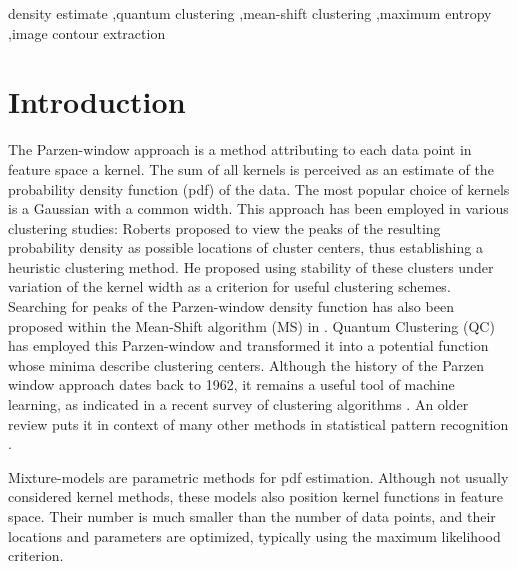 \documentclass[preprint,12pt]{elsarticle}
\begin{document}
\begin{frontmatter}
\begin{abstract}
\end{abstract}

\begin{keyword}
density estimate \sep quantum clustering \sep mean-shift clustering \sep maximum entropy \sep image contour extraction


\end{keyword}

\end{frontmatter}





\section{Introduction}
\label{introduction}
The Parzen-window approach \cite{parzen1962estimation} is a method attributing to each data point in feature space a kernel. The sum of all kernels is perceived as an estimate of the probability density function (pdf) of the data. The most popular choice of kernels is a Gaussian with a common width. This approach has been employed in various clustering studies: Roberts \cite{roberts1997} proposed to view the peaks of the resulting probability density as possible locations of cluster centers, thus establishing a heuristic clustering method. He proposed using stability of these clusters under variation of the kernel width as a criterion for useful clustering schemes. Searching for peaks of the Parzen-window density function has also been proposed within the Mean-Shift algorithm (MS) in \cite{cheng1995,comaniciu2002,rao2009mean}. Quantum Clustering (QC) \cite{horn2001} has employed this Parzen-window and transformed it into a potential function whose minima describe clustering centers. Although the history of the Parzen window approach dates back to 1962, it remains a useful tool of machine learning, as indicated in a recent survey of clustering algorithms \cite{xu2015comprehensive}. An older review puts it in context of many other methods in statistical pattern recognition \cite{jain2000statistical}.

Mixture-models \cite{titterington1985} are parametric methods for pdf estimation. Although not usually considered kernel methods, these models also position kernel functions in feature space. Their number is much smaller than the number of data points, and their locations and parameters are optimized, typically using the maximum likelihood criterion. 
\end{document}
